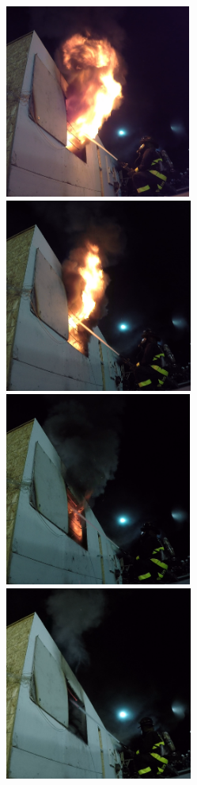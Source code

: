 \documentclass[12pt,oneside]{book}
\begin{document}
\begin{figure}[H]
\centering
\includegraphics[height=2.5in]{../0_Images/Tactical_Considerations/Transitional_Attack/Suppression}
\includegraphics[height=2.5in]{../0_Images/Tactical_Considerations/Transitional_Attack/1_Sec}
\includegraphics[height=2.5in]{../0_Images/Tactical_Considerations/Transitional_Attack/2_Sec}
\includegraphics[height=2.5in]{../0_Images/Tactical_Considerations/Transitional_Attack/3_Sec}

\end{figure}
\end{document}
